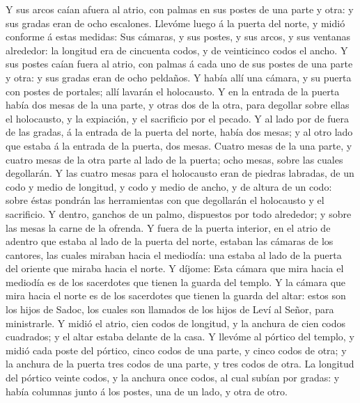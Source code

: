 Y sus arcos caían afuera al atrio, con palmas en sus
postes de una parte y otra: y sus gradas eran de ocho escalones.
 Llevóme luego á la puerta del norte, y midió conforme á
estas medidas:  Sus cámaras, y sus postes, y sus arcos, y
sus ventanas alrededor: la longitud era de cincuenta codos, y de
veinticinco codos el ancho.  Y sus postes caían fuera al
atrio, con palmas á cada uno de sus postes de una parte y otra: y sus
gradas eran de ocho peldaños.  Y había allí una cámara, y
su puerta con postes de portales; allí lavarán el holocausto.
 Y en la entrada de la puerta había dos mesas de la una
parte, y otras dos de la otra, para degollar sobre ellas el holocausto,
y la expiación, y el sacrificio por el pecado.  Y al lado
por de fuera de las gradas, á la entrada de la puerta del norte, había
dos mesas; y al otro lado que estaba á la entrada de la puerta, dos
mesas.  Cuatro mesas de la una parte, y cuatro mesas de
la otra parte al lado de la puerta; ocho mesas, sobre las cuales
degollarán.  Y las cuatro mesas para el holocausto eran
de piedras labradas, de un codo y medio de longitud, y codo y medio de
ancho, y de altura de un codo: sobre éstas pondrán las herramientas con
que degollarán el holocausto y el sacrificio.  Y dentro,
ganchos de un palmo, dispuestos por todo alrededor; y sobre las mesas la
carne de la ofrenda.  Y fuera de la puerta interior, en
el atrio de adentro que estaba al lado de la puerta del norte, estaban
las cámaras de los cantores, las cuales miraban hacia el mediodía: una
estaba al lado de la puerta del oriente que miraba hacia el norte.
 Y díjome: Esta cámara que mira hacia el mediodía es de
los sacerdotes que tienen la guarda del templo.  Y la
cámara que mira hacia el norte es de los sacerdotes que tienen la guarda
del altar: estos son los hijos de Sadoc, los cuales son llamados de los
hijos de Leví al Señor, para ministrarle.  Y midió el
atrio, cien codos de longitud, y la anchura de cien codos cuadrados; y
el altar estaba delante de la casa.  Y llevóme al pórtico
del templo, y midió cada poste del pórtico, cinco codos de una parte, y
cinco codos de otra; y la anchura de la puerta tres codos de una parte,
y tres codos de otra.  La longitud del pórtico veinte
codos, y la anchura once codos, al cual subían por gradas: y había
columnas junto á los postes, una de un lado, y otra de otro.

